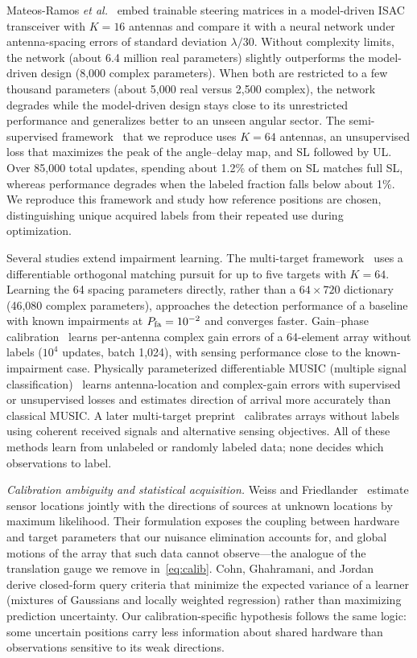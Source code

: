 \documentclass[conference]{IEEEtran}
\begin{document}
Mateos-Ramos \emph{et al.}~\cite{icc} embed trainable steering matrices in a model-driven ISAC transceiver with $K=16$ antennas and compare it with a neural network under antenna-spacing errors of standard deviation $\lambda/30$. Without complexity limits, the network (about 6.4 million real parameters) slightly outperforms the model-driven design (8,000 complex parameters). When both are restricted to a few thousand parameters (about 5,000 real versus 2,500 complex), the network degrades while the model-driven design stays close to its unrestricted performance and generalizes better to an unseen angular sector. The semi-supervised framework~\cite{ssl} that we reproduce uses $K=64$ antennas, an unsupervised loss that maximizes the peak of the angle--delay map, and SL followed by UL. Over 85,000 total updates, spending about 1.2\% of them on SL matches full SL, whereas performance degrades when the labeled fraction falls below about 1\%. We reproduce this framework and study how reference positions are chosen, distinguishing unique acquired labels from their repeated use during optimization.

Several studies extend impairment learning. The multi-target framework~\cite{multi} uses a differentiable orthogonal matching pursuit for up to five targets with $K=64$. Learning the 64 spacing parameters directly, rather than a $64\times720$ dictionary (46,080 complex parameters), approaches the detection performance of a baseline with known impairments at $P_{\rm fa}=10^{-2}$ and converges faster. Gain--phase calibration~\cite{gain} learns per-antenna complex gain errors of a 64-element array without labels ($10^4$ updates, batch 1,024), with sensing performance close to the known-impairment case. Physically parameterized differentiable MUSIC (multiple signal classification)~\cite{music} learns antenna-location and complex-gain errors with supervised or unsupervised losses and estimates direction of arrival more accurately than classical MUSIC. A later multi-target preprint~\cite{multiul} calibrates arrays without labels using coherent received signals and alternative sensing objectives. All of these methods learn from unlabeled or randomly labeled data; none decides which observations to label.

\emph{Calibration ambiguity and statistical acquisition.} Weiss and Friedlander~\cite{weiss} estimate sensor locations jointly with the directions of sources at unknown locations by maximum likelihood. Their formulation exposes the coupling between hardware and target parameters that our nuisance elimination accounts for, and global motions of the array that such data cannot observe---the analogue of the translation gauge we remove in~\eqref{eq:calib}. Cohn, Ghahramani, and Jordan~\cite{cohn} derive closed-form query criteria that minimize the expected variance of a learner (mixtures of Gaussians and locally weighted regression) rather than maximizing prediction uncertainty. Our calibration-specific hypothesis follows the same logic: some uncertain positions carry less information about shared hardware than observations sensitive to its weak directions.
\end{document}
